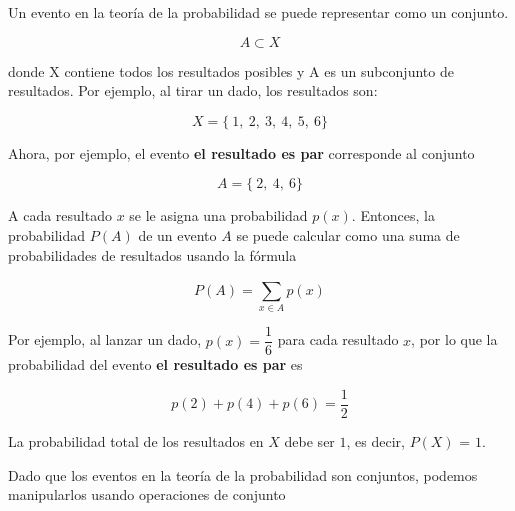 Un evento en la teoría de la probabilidad se puede representar como un conjunto.

$$A \subset X$$

donde X contiene todos los resultados posibles y A es un subconjunto de
resultados. Por ejemplo, al tirar un dado, los resultados son:

$$X = \{~1,~2,~3,~4,~5,~6\}$$

Ahora, por ejemplo, el evento \textbf{el resultado es par} corresponde al conjunto

$$A = \{~2,~4,~6\}$$

A cada resultado $x$ se le asigna una probabilidad $p(x)$. Entonces, la probabilidad $P(A)$
de un evento $A$ se puede calcular como una suma de probabilidades de resultados usando
la fórmula 

$$P(A) = \sum_{x \in A}^{} p(x)$$

Por ejemplo, al lanzar un dado, $p(x) = \dfrac{1}{6}$ para cada resultado $x$, por lo que la
probabilidad del evento \textbf{el resultado es par} es

$$p(2)+ p(4)+ p(6) = 
\dfrac{1}{2}$$

La probabilidad total de los resultados en $X$ debe ser $1$, es decir, $P(X)$ = $1$.

Dado que los eventos en la teoría de la probabilidad son conjuntos, podemos manipularlos usando operaciones de conjunto

